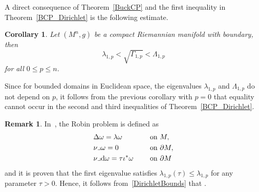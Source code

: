 \documentclass[10pt,a4paper]{amsart}
\numberwithin{equation}{section}
\newtheorem{Corollary}[Theorem]{Corollary}
\theoremstyle{definition}
\newtheorem{Remark}[Theorem]{Remark}
\begin{document}
A direct consequence of Theorem~\ref{BuckCP} and the first inequality in Theorem~\ref{BCP_Dirichlet} is the following estimate.
\begin{Corollary}\label{DBCP}
Let $(M^n,g)$ be a compact Riemannian manifold with boundary, then
\begin{equation}\label{DirichletBounds}
\lambda_{1,p}<\sqrt{\Gamma_{1,p}}<\Lambda_{1,p}
\end{equation}
for all $0\leq p\leq n$.
\end{Corollary}

Since for bounded domains in Euclidean space, the eigenvalues $\lambda_{1,p}$ and $\Lambda_{1,p}$ do not depend on $p$, it follows from the previous corollary with $p=0$ that equality cannot occur in the second and third inequalities of Theorem~\ref{BCP_Dirichlet}.

\begin{Remark} In~\cite{elchamiginouxhabib19}, the Robin problem is defined as
\[
\begin{aligned}
&\Delta \omega =\lambda \omega \ \quad&&\textrm{on } M, \\
&\nu\lrcorner\omega =0\ \quad&&\textrm{on }\partial M, \\
&\nu\lrcorner {\rm d}\omega = \tau \iota^*\omega \ \quad && \textrm{on }\partial M
\end{aligned}
\]
and it is proven that the first eigenvalue satisfies $\lambda_{1,p}(\tau)\leq \lambda_{1,p}$ for any parameter $\tau>0$.
Hence, it follows from~\eqref{DirichletBounds} that .
\end{Remark}
\end{document}
